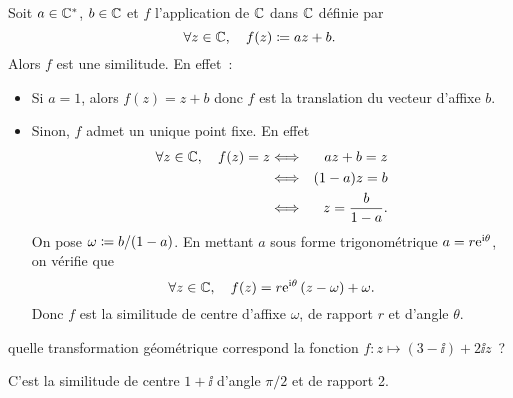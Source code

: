 \documentclass{magnolia}
\begin{document}
\begin{preuve}
Soit $a\in\mathbb{C}^*$, $b\in\mathbb{C}$ et $f$ l'application de $\mathbb{C}$ dans $\mathbb{C}$ définie par
\[\forall z\in\mathbb{C},\quad f(z)\coloneqq az+b.\]
Alors $f$ est une similitude. En effet~:
\begin{itemize}
\item Si $a=1$, alors $f(z)=z+b$ donc $f$ est la translation du vecteur d'affixe $b$.
\item Sinon, $f$ admet un unique point fixe. En effet
\begin{eqnarray*}
\forall z\in\mathbb{C},\quad f(z)=z
&\Longleftrightarrow& az+b = z\\
&\Longleftrightarrow& (1-a)z=b\\
&\Longleftrightarrow& z=\frac{b}{1-a}.
\end{eqnarray*}
On pose $\omega\coloneqq b/(1-a)$. En mettant $a$ sous forme trigonométrique $a= r{\rm e}^{{\rm i}\theta}$, on vérifie que
\[\forall z\in\mathbb{C},\quad f(z)=r{\rm e}^{{\rm i}\theta}\left(z-\omega\right)+\omega.\]
Donc $f$ est la similitude de centre d'affixe $\omega$, de rapport $r$ et d'angle $\theta$.
\end{itemize}
\end{preuve}

\begin{exoUnique}
 quelle transformation géométrique correspond la fonction $f : z \mapsto
(3-\ii)+2\ii z$~?
\begin{sol}
C'est la similitude de centre $1+\ii$ d'angle $\pi/2$ et de rapport 2.
\end{sol}
\end{exoUnique}


\end{document}
